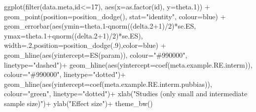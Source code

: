 \documentclass[
]{book}
\newenvironment{Shaded}{\begin{snugshade}}{\end{snugshade}}
\newcommand{\AttributeTok}[1]{\textcolor[rgb]{0.77,0.63,0.00}{#1}}
\newcommand{\DecValTok}[1]{\textcolor[rgb]{0.00,0.00,0.81}{#1}}
\newcommand{\FloatTok}[1]{\textcolor[rgb]{0.00,0.00,0.81}{#1}}
\newcommand{\FunctionTok}[1]{\textcolor[rgb]{0.00,0.00,0.00}{#1}}
\newcommand{\NormalTok}[1]{#1}
\newcommand{\SpecialCharTok}[1]{\textcolor[rgb]{0.00,0.00,0.00}{#1}}
\newcommand{\StringTok}[1]{\textcolor[rgb]{0.31,0.60,0.02}{#1}}
\theoremstyle{definition}
\theoremstyle{definition}
\theoremstyle{definition}
\theoremstyle{definition}
\theoremstyle{remark}
\begin{document}
\begin{Shaded}
\begin{Highlighting}[]
  \FunctionTok{ggplot}\NormalTok{(}\FunctionTok{filter}\NormalTok{(data.meta,id}\SpecialCharTok{\textless{}=}\DecValTok{17}\NormalTok{), }\FunctionTok{aes}\NormalTok{(}\AttributeTok{x=}\FunctionTok{as.factor}\NormalTok{(id), }\AttributeTok{y=}\NormalTok{theta}\FloatTok{.1}\NormalTok{)) }\SpecialCharTok{+}
      \FunctionTok{geom\_point}\NormalTok{(}\AttributeTok{position=}\FunctionTok{position\_dodge}\NormalTok{(), }\AttributeTok{stat=}\StringTok{"identity"}\NormalTok{, }\AttributeTok{colour=}\StringTok{\textquotesingle{}blue\textquotesingle{}}\NormalTok{) }\SpecialCharTok{+}
      \FunctionTok{geom\_errorbar}\NormalTok{(}\FunctionTok{aes}\NormalTok{(}\AttributeTok{ymin=}\NormalTok{theta}\FloatTok{.1}\SpecialCharTok{{-}}\FunctionTok{qnorm}\NormalTok{((delta}\FloatTok{.2}\SpecialCharTok{+}\DecValTok{1}\NormalTok{)}\SpecialCharTok{/}\DecValTok{2}\NormalTok{)}\SpecialCharTok{*}\NormalTok{se.ES, }\AttributeTok{ymax=}\NormalTok{theta}\FloatTok{.1}\SpecialCharTok{+}\FunctionTok{qnorm}\NormalTok{((delta}\FloatTok{.2}\SpecialCharTok{+}\DecValTok{1}\NormalTok{)}\SpecialCharTok{/}\DecValTok{2}\NormalTok{)}\SpecialCharTok{*}\NormalTok{se.ES), }\AttributeTok{width=}\NormalTok{.}\DecValTok{2}\NormalTok{,}\AttributeTok{position=}\FunctionTok{position\_dodge}\NormalTok{(.}\DecValTok{9}\NormalTok{),}\AttributeTok{color=}\StringTok{\textquotesingle{}blue\textquotesingle{}}\NormalTok{) }\SpecialCharTok{+}
      \FunctionTok{geom\_hline}\NormalTok{(}\FunctionTok{aes}\NormalTok{(}\AttributeTok{yintercept=}\FunctionTok{ES}\NormalTok{(param)), }\AttributeTok{colour=}\StringTok{"\#990000"}\NormalTok{, }\AttributeTok{linetype=}\StringTok{"dashed"}\NormalTok{)}\SpecialCharTok{+}
      \FunctionTok{geom\_hline}\NormalTok{(}\FunctionTok{aes}\NormalTok{(}\AttributeTok{yintercept=}\FunctionTok{coef}\NormalTok{(meta.example.RE.interm)), }\AttributeTok{colour=}\StringTok{"\#990000"}\NormalTok{, }\AttributeTok{linetype=}\StringTok{"dotted"}\NormalTok{)}\SpecialCharTok{+}
      \FunctionTok{geom\_hline}\NormalTok{(}\FunctionTok{aes}\NormalTok{(}\AttributeTok{yintercept=}\FunctionTok{coef}\NormalTok{(meta.example.RE.interm.pubbias)), }\AttributeTok{colour=}\StringTok{"green"}\NormalTok{, }\AttributeTok{linetype=}\StringTok{"dotted"}\NormalTok{)}\SpecialCharTok{+}
      \FunctionTok{xlab}\NormalTok{(}\StringTok{"Studies (only small and intermediate sample size)"}\NormalTok{)}\SpecialCharTok{+}
      \FunctionTok{ylab}\NormalTok{(}\StringTok{"Effect size"}\NormalTok{)}\SpecialCharTok{+}
      \FunctionTok{theme\_bw}\NormalTok{()}


\end{Highlighting}
\end{Shaded}
\end{document}
